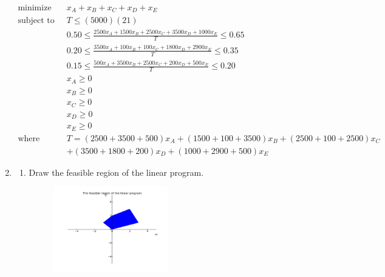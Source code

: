 \documentclass[letterpaper,11pt]{article}
\begin{document}
\begin{enumerate}
        \begin{align*}
            \text{minimize} \quad
                & x_A + x_B + x_C + x_D + x_E                                                         \\
            \text{subject to} \quad
                & T    \leq (5000)(21)                                                                \\
                & 0.50 \leq \frac{2500x_A + 1500x_B + 2500x_C + 3500x_D + 1000x_E}{T} \leq 0.65       \\
                & 0.20 \leq \frac{3500x_A + 100x_B  + 100x_C  + 1800x_D + 2900x_E}{T} \leq 0.35       \\
                & 0.15 \leq \frac{500x_A  + 3500x_B + 2500x_C + 200x_D  + 500x_E }{T} \leq 0.20       \\
                & x_A  \geq 0                                                                         \\
                & x_B  \geq 0                                                                         \\
                & x_C  \geq 0                                                                         \\
                & x_D  \geq 0                                                                         \\
                & x_E  \geq 0                                                                         \\
            \text{where} \quad
                & T    = (2500 + 3500 + 500) x_A + (1500 + 100 + 3500) x_B + (2500 + 100 + 2500) x_C  \\
                &      + (3500 + 1800 + 200) x_D + (1000 + 2900 + 500) x_E
        \end{align*}

    \item

        \begin{enumerate}
            \item Draw the feasible region of the linear program.

                \begin{figure}[H]
                    \centering
                    \includegraphics[width=0.5\textwidth]{plot.pdf}
                \end{figure}


\end{enumerate}
\end{enumerate}
\end{document}
